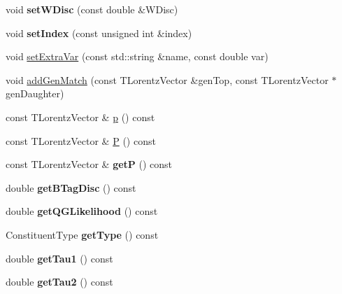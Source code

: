 \begin{DoxyCompactItemize}
\item 
\hypertarget{classConstituent_a48d0d129c41154c3dcaa51ff3e5c44c3}{void {\bfseries set\-W\-Disc} (const double \&W\-Disc)}\label{classConstituent_a48d0d129c41154c3dcaa51ff3e5c44c3}

\item 
\hypertarget{classConstituent_abc67caff918e263ec1e58372efa4641b}{void {\bfseries set\-Index} (const unsigned int \&index)}\label{classConstituent_abc67caff918e263ec1e58372efa4641b}

\item 
void \hyperlink{classConstituent_a1b2fc086bc359e141e54ed2903c951c9}{set\-Extra\-Var} (const std\-::string \&name, const double var)
\item 
void \hyperlink{classConstituent_a2aea6bdc5229bb87227bcc8caa9c51c6}{add\-Gen\-Match} (const T\-Lorentz\-Vector \&gen\-Top, const T\-Lorentz\-Vector $\ast$gen\-Daughter)
\item 
const T\-Lorentz\-Vector \& \hyperlink{classConstituent_a3f918f1210cc666288327544e32d728c}{p} () const 
\item 
const T\-Lorentz\-Vector \& \hyperlink{classConstituent_a9f95db0ef9ae97fa0dc2cf45153e4131}{P} () const 
\item 
\hypertarget{classConstituent_ac4954793667cf0b2ffd136fbd8df0cda}{const T\-Lorentz\-Vector \& {\bfseries get\-P} () const }\label{classConstituent_ac4954793667cf0b2ffd136fbd8df0cda}

\item 
\hypertarget{classConstituent_af2cbdf02c47682a97db91a724a4ae3e1}{double {\bfseries get\-B\-Tag\-Disc} () const }\label{classConstituent_af2cbdf02c47682a97db91a724a4ae3e1}

\item 
\hypertarget{classConstituent_ae58e807a0bd4adfff6c052882f2f9396}{double {\bfseries get\-Q\-G\-Likelihood} () const }\label{classConstituent_ae58e807a0bd4adfff6c052882f2f9396}

\item 
\hypertarget{classConstituent_a325cb683912acb64e2fcbde14726f6a6}{Constituent\-Type {\bfseries get\-Type} () const }\label{classConstituent_a325cb683912acb64e2fcbde14726f6a6}

\item 
\hypertarget{classConstituent_a2c057eb66cfeed68e5bd58e1c5815e8b}{double {\bfseries get\-Tau1} () const }\label{classConstituent_a2c057eb66cfeed68e5bd58e1c5815e8b}

\item 
\hypertarget{classConstituent_aa43ea922dc8db06b1b28b8a66db0edac}{double {\bfseries get\-Tau2} () const }\label{classConstituent_aa43ea922dc8db06b1b28b8a66db0edac}


\end{DoxyCompactItemize}
